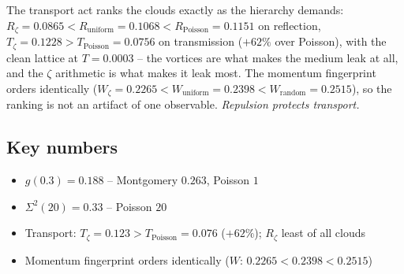 \documentclass[11pt,a4paper]{article}
\begin{document}
The transport act ranks the clouds exactly as the hierarchy demands: $R_\zeta = 0.0865 < R_{\mathrm{uniform}} = 0.1068 < R_{\mathrm{Poisson}} = 0.1151$ on reflection, $T_\zeta = 0.1228 > T_{\mathrm{Poisson}} = 0.0756$ on transmission ($+62\%$ over Poisson), with the clean lattice at $T = 0.0003$ -- the vortices are what makes the medium leak at all, and the $\zeta$ arithmetic is what makes it leak most. The momentum fingerprint orders identically ($W_{\zeta} = 0.2265 < W_{\mathrm{uniform}} = 0.2398 < W_{\mathrm{random}} = 0.2515$), so the ranking is not an artifact of one observable. \emph{Repulsion protects transport.}

\subsection{Key numbers}
\begin{tcolorbox}[colback=labblue!6, colframe=labblue!70!black, boxrule=0.6pt, title={Key results (canonical run)}]
\begin{itemize}[leftmargin=1.2em, itemsep=0.15em]
\item $g(0.3) = 0.188$ -- Montgomery $0.263$, Poisson $1$
\item $\Sigma^2(20) = 0.33$ -- Poisson $20$
\item Transport: $T_\zeta = 0.123 > T_{\mathrm{Poisson}} = 0.076$ ($+62\%$); $R_\zeta$ least of all clouds
\item Momentum fingerprint orders identically ($W$: $0.2265 < 0.2398 < 0.2515$)
\end{itemize}
\end{tcolorbox}
\end{document}
